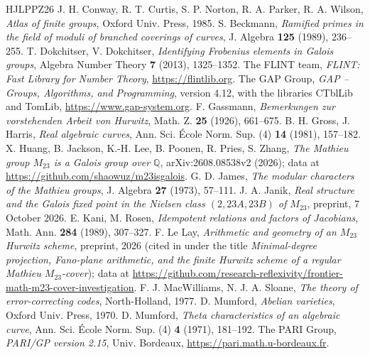 \documentclass[11pt]{amsart}
\theoremstyle{definition}
\begin{document}
\begin{thebibliography}{HJLPPZ26}
 J. H. Conway, R. T. Curtis, S. P. Norton, R. A. Parker, R. A. Wilson, \emph{Atlas of finite groups}, Oxford Univ. Press, 1985.
 S. Beckmann, \emph{Ramified primes in the field of moduli of branched coverings of curves}, J. Algebra \textbf{125} (1989), 236--255.
 T. Dokchitser, V. Dokchitser, \emph{Identifying Frobenius elements in Galois groups}, Algebra Number Theory \textbf{7} (2013), 1325--1352.
 The FLINT team, \emph{FLINT: Fast Library for Number Theory}, \url{https://flintlib.org}.
 The GAP Group, \emph{GAP -- Groups, Algorithms, and Programming}, version 4.12, with the libraries CTblLib and TomLib, \url{https://www.gap-system.org}.
 F. Gassmann, \emph{Bemerkungen zur vorstehenden Arbeit von Hurwitz}, Math. Z. \textbf{25} (1926), 661--675.
 B. H. Gross, J. Harris, \emph{Real algebraic curves}, Ann. Sci. \'Ecole Norm. Sup. (4) \textbf{14} (1981), 157--182.
 X. Huang, B. Jackson, K.-H. Lee, B. Poonen, R. Pries, S. Zhang, \emph{The Mathieu group $M_{23}$ is a Galois group over $\mathbb{Q}$}, arXiv:2608.08538v2 (2026); data at \url{https://github.com/shaowuz/m23isgalois}.
 G. D. James, \emph{The modular characters of the Mathieu groups}, J. Algebra \textbf{27} (1973), 57--111.
 J. A. Janik, \emph{Real structure and the Galois fixed point in the Nielsen class $(2,23A,23B)$ of $M_{23}$}, preprint, 7 October 2026.
 E. Kani, M. Rosen, \emph{Idempotent relations and factors of Jacobians}, Math. Ann. \textbf{284} (1989), 307--327.
 F. Le Lay, \emph{Arithmetic and geometry of an $M_{23}$ Hurwitz scheme}, preprint, 2026 (cited in \cite{HJLPPZ26} under the title \emph{Minimal-degree projection, Fano-plane arithmetic, and the finite Hurwitz scheme of a regular Mathieu $M_{23}$-cover}); data at \url{https://github.com/research-reflexivity/frontier-math-m23-cover-investigation}.
 F. J. MacWilliams, N. J. A. Sloane, \emph{The theory of error-correcting codes}, North-Holland, 1977.
 D. Mumford, \emph{Abelian varieties}, Oxford Univ. Press, 1970.
 D. Mumford, \emph{Theta characteristics of an algebraic curve}, Ann. Sci. \'Ecole Norm. Sup. (4) \textbf{4} (1971), 181--192.
 The PARI Group, \emph{PARI/GP version 2.15}, Univ. Bordeaux, \url{https://pari.math.u-bordeaux.fr}.

\end{thebibliography}
\end{document}
